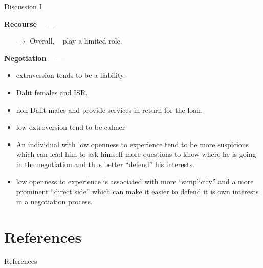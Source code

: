 \documentclass[aspectratio=169]{beamer}
\begin{document}
\begin{frame}{Discussion I}

\textbf{Recourse ~~---}
\begin{itemize}
\item[$\rightarrow$] Overall, \PTCS~ play a limited role.
\end{itemize}


\textbf{Negotiation ~~---}
\begin{itemize}
\item \citep{Barry1998} extraversion tends to be a liability:
\item Dalit females and ISR.
\item non-Dalit males and provide services in return for the loan.
\item low extroversion tend to be calmer
\item An individual with low openness to experience tend to be more suspicious which can lead him to ask himself more questions to know where he is going in the negotiation and thus better ``defend'' his interests.
\item low openness to experience is associated with more “simplicity” and a more prominent ``direct side'' which can make it easier to defend it is own interests in a negotiation process.
\end{itemize}


\end{frame}




\begin{frame}


\end{frame}







\section*{References}
\begin{frame}{References}

\printbibliography[title={References},heading=none]

\end{frame}
\end{document}
